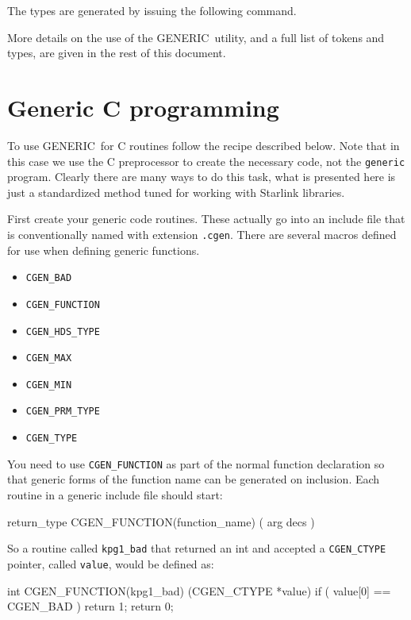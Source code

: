 \documentclass[twoside,11pt,nolof]{starlink}
\providecommand{\GENERIC}{{\footnotesize GENERIC}\normalsize}
\begin{document}
The types are generated by issuing the following command.

\begin{terminalv}
\end{terminalv}

More details on the use of the \GENERIC\ utility, and a full list of
tokens and types, are given in the rest of this document.

\section{Generic C programming}

To use \GENERIC\ for C routines follow the recipe described below. Note that
in this case we use the C preprocessor to create the necessary code, not the
\texttt{generic} program. Clearly there are many ways to do this task, what is
presented here is just a standardized method tuned for working with Starlink
libraries.

First create your generic code routines. These actually go into an include
file that is conventionally named with extension \texttt{.cgen}. There are several
macros defined for use when defining generic functions.

\begin{itemize}
\item \texttt{CGEN\_BAD}
\item \texttt{CGEN\_FUNCTION}
\item \texttt{CGEN\_HDS\_TYPE}
\item \texttt{CGEN\_MAX}
\item \texttt{CGEN\_MIN}
\item \texttt{CGEN\_PRM\_TYPE}
\item \texttt{CGEN\_TYPE}
\end{itemize}

You need to use \texttt{CGEN\_FUNCTION} as part of the normal function
declaration so that generic forms of the function name can be generated on
inclusion. Each routine in a generic include file should start:

\begin{terminalv}
return_type CGEN_FUNCTION(function_name) ( arg decs )
\end{terminalv}

So a routine called \texttt{kpg1\_bad} that returned an int and accepted a
\texttt{CGEN\_CTYPE} pointer, called \texttt{value}, would be defined as:

\begin{terminalv}
    int CGEN_FUNCTION(kpg1_bad) (CGEN_CTYPE *value) {
        if ( value[0] == CGEN_BAD ) {
           return 1;
        }
        return 0;
    }
\end{terminalv}
\end{document}
